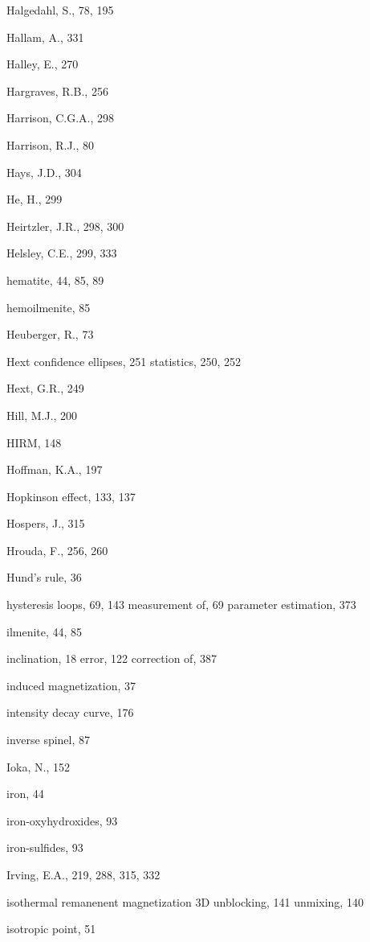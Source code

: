\documentclass[,plain]{tauxe}
\begin{document}
\begin{theindex}
  \item Halgedahl, S., 78, 195
  \item Hallam, A., 331
  \item Halley, E., 270
  \item Hargraves, R.B., 256
  \item Harrison, C.G.A., 298
  \item Harrison, R.J., 80
  \item Hays, J.D., 304
  \item He, H., 299
  \item Heirtzler, J.R., 298, 300
  \item Helsley, C.E., 299, 333
  \item hematite, 44, 85, 89
  \item hemoilmenite, 85
  \item Heuberger, R., 73
  \item Hext
    \subitem confidence ellipses, 251
    \subitem statistics, 250, 252
  \item Hext, G.R., 249
  \item Hill, M.J., 200
  \item HIRM, 148
  \item Hoffman, K.A., 197
  \item Hopkinson effect, 133, 137
  \item Hospers, J., 315
  \item Hrouda, F., 256, 260
  \item Hund's rule, 36
  \item hysteresis
    \subitem loops, 69, 143
    \subitem measurement of, 69
    \subitem parameter estimation, 373

  \indexspace

  \item ilmenite, 44, 85
  \item inclination, 18
    \subitem error, 122
      \subsubitem correction of, 387
  \item induced magnetization, 37
  \item intensity decay curve, 176
  \item inverse spinel, 87
  \item Ioka, N., 152
  \item iron, 44
  \item iron-oxyhydroxides, 93
  \item iron-sulfides, 93
  \item Irving, E.A., 219, 288, 315, 332
  \item isothermal remanenent magnetization
    \subitem 3D unblocking, 141
    \subitem unmixing, 140
  \item isotropic point, 51


\end{theindex}
\end{document}
